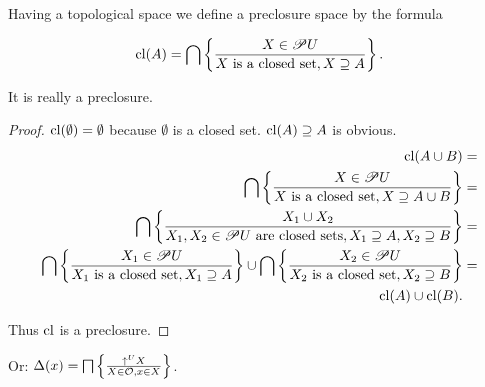 Having a topological space we define a preclosure space by the formula

\[
\operatorname{cl}(A)=\bigcap\left\{ \frac{X\in\mathscr{P} U}{X\text{ is a closed set},X\supseteq A}\right\}.
\]

\begin{prop}
It is really a preclosure.\end{prop}
\begin{proof}
$\operatorname{cl}(\emptyset)=\emptyset$ because $\emptyset$ is a closed set.
$\operatorname{cl}(A)\supseteq A$ is obvious.
\begin{align*}
\operatorname{cl}(A\cup B) & =\\
\bigcap\left\{ \frac{X\in\mathscr{P} U}{X\text{ is a closed set},X\supseteq A\cup B}\right\} & =\\
\bigcap\left\{ \frac{X_{1}\cup X_{2}}{X_{1},X_{2}\in\mathscr{P} U\text{ are closed sets},X_{1}\supseteq A,X_{2}\supseteq B}\right\} & =\\
\bigcap\left\{ \frac{X_{1}\in\mathscr{P} U}{X_{1}\text{ is a closed set},X_{1}\supseteq A}\right\}\cup\bigcap\left\{ \frac{X_{2}\in\mathscr{P} U}{X_{2}\text{ is a closed set},X_{2}\supseteq B}\right\} & =\\
\operatorname{cl}(A)\cup\operatorname{cl}(B).
\end{align*}


Thus $\operatorname{cl}$ is a preclosure.
\end{proof}
Or: $\Delta(x)=\bigsqcap\left\{ \frac{\uparrow^{U}X}{X\in\mathcal{O},x\in X}\right\}$.

